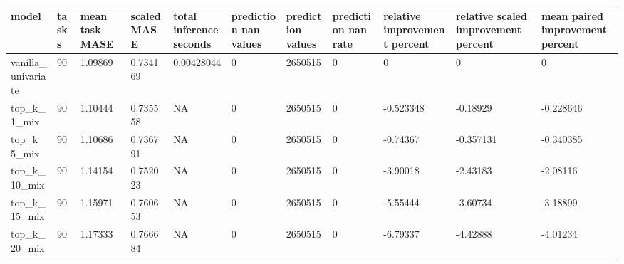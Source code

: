 \begin{tabular}{lllllllllll}
\toprule
model & tasks & mean task MASE & scaled MASE & total inference seconds & prediction nan values & prediction values & prediction nan rate & relative improvement percent & relative scaled improvement percent & mean paired improvement percent \\
\midrule
vanilla\_univariate & 90 & 1.09869 & 0.734169 & 0.00428044 & 0 & 2650515 & 0 & 0 & 0 & 0 \\
top\_k\_1\_mix & 90 & 1.10444 & 0.735558 & NA & 0 & 2650515 & 0 & -0.523348 & -0.18929 & -0.228646 \\
top\_k\_5\_mix & 90 & 1.10686 & 0.736791 & NA & 0 & 2650515 & 0 & -0.74367 & -0.357131 & -0.340385 \\
top\_k\_10\_mix & 90 & 1.14154 & 0.752023 & NA & 0 & 2650515 & 0 & -3.90018 & -2.43183 & -2.08116 \\
top\_k\_15\_mix & 90 & 1.15971 & 0.760653 & NA & 0 & 2650515 & 0 & -5.55444 & -3.60734 & -3.18899 \\
top\_k\_20\_mix & 90 & 1.17333 & 0.766684 & NA & 0 & 2650515 & 0 & -6.79337 & -4.42888 & -4.01234 \\
\bottomrule
\end{tabular}
